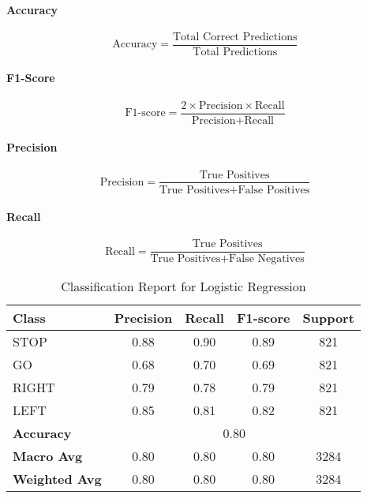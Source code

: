 
\paragraph{Accuracy}
$$
\text{Accuracy} = \frac{\text{Total Correct Predictions}}{\text{Total Predictions}}
$$

\paragraph{F1-Score}
$$
\text{F1-score} = \frac{2 \times \text{Precision} \times \text{Recall}}{\text{Precision} + \text{Recall}}
$$

\paragraph{Precision}
$$
\text{Precision} = \frac{\text{True Positives}}{\text{True Positives} + \text{False Positives}}
$$

\paragraph{Recall}
$$
\text{Recall} = \frac{\text{True Positives}}{\text{True Positives} + \text{False Negatives}}
$$

\begin{table}[h]
\centering
\caption{Classification Report for Logistic Regression}
\begin{tabular}{lcccc}
\hline
\textbf{Class} & \textbf{Precision} & \textbf{Recall} & \textbf{F1-score} & \textbf{Support} \\
\hline
STOP  & 0.88 & 0.90 & 0.89 & 821 \\
GO    & 0.68 & 0.70 & 0.69 & 821 \\
RIGHT & 0.79 & 0.78 & 0.79 & 821 \\
LEFT  & 0.85 & 0.81 & 0.82 & 821 \\
\hline
\textbf{Accuracy} & \multicolumn{4}{c}{0.80} \\
\textbf{Macro Avg} & 0.80 & 0.80 & 0.80 & 3284 \\
\textbf{Weighted Avg} & 0.80 & 0.80 & 0.80 & 3284 \\
\hline
\end{tabular}
\label{tab:classification_report_logreg}
\end{table}


